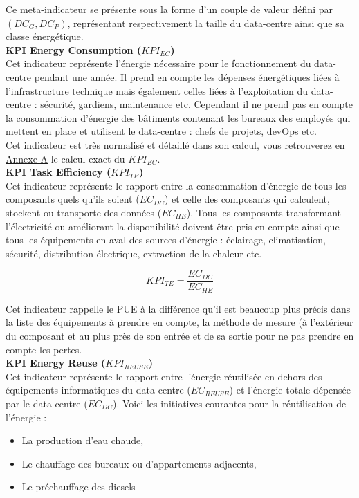 Ce meta-indicateur se présente sous la forme d'un couple de valeur défini par $(DC_G, DC_P)$, représentant respectivement la taille du data-centre ainsi que sa classe énergétique.\\

\textbf{KPI Energy Consumption ($KPI_{EC}$)}\\
Cet indicateur représente l'énergie nécessaire pour le fonctionnement du data-centre pendant une année. Il prend en compte les dépenses énergétiques liées à l'infrastructure technique mais également celles liées à l'exploitation du data-centre : sécurité, gardiens, maintenance etc. Cependant il ne prend pas en compte la consommation d'énergie des bâtiments contenant les bureaux des employés qui mettent en place et utilisent le data-centre : chefs de projets, devOps etc.\\

Cet indicateur est très normalisé et détaillé dans son calcul, vous retrouverez en \hyperref[appendix:kpiec]{Annexe A} le calcul exact du $KPI_{EC}$.\\

\textbf{KPI Task Efficiency ($KPI_{TE}$)}\\
Cet indicateur représente le rapport entre la consommation d'énergie de tous les composants quels qu'ils soient ($EC_{DC}$) et celle des composants qui calculent, stockent ou transporte des données ($EC_{HE}$).
Tous les composants transformant l'électricité ou améliorant la disponibilité doivent être pris en compte ainsi que tous les équipements en aval des sources d'énergie : éclairage, climatisation, sécurité, distribution électrique, extraction de la chaleur etc.

\[KPI_{TE} = \frac{EC_{DC}}{EC_{HE}}\]

Cet indicateur rappelle le PUE à la différence qu'il est beaucoup plus précis dans la liste des équipements à prendre en compte, la méthode de mesure (à l'extérieur du composant et au plus près de son entrée et de sa sortie pour ne pas prendre en compte les pertes.\\

\textbf{KPI Energy Reuse ($KPI_{REUSE}$)}\\
Cet indicateur représente le rapport entre l'énergie réutilisée en dehors des équipements informatiques du data-centre ($EC_{REUSE}$) et l'énergie totale dépensée par le data-centre ($EC_{DC}$).
Voici les initiatives courantes pour la réutilisation de l'énergie :
\begin{itemize}
	\item La production d'eau chaude,
	\item Le chauffage des bureaux ou d'appartements adjacents,
	\item Le préchauffage des diesels
\end{itemize}

